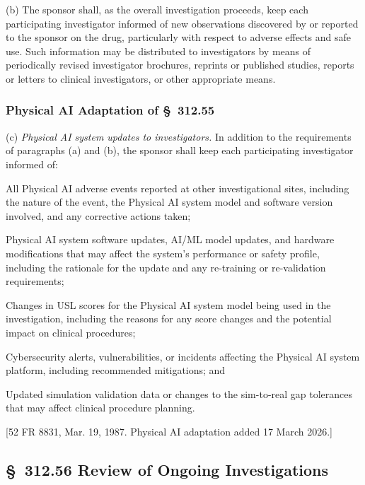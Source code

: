 (b) The sponsor shall, as the overall investigation proceeds, keep each participating investigator informed of new observations discovered by or reported to the sponsor on the drug, particularly with respect to adverse effects and safe use. Such information may be distributed to investigators by means of periodically revised investigator brochures, reprints or published studies, reports or letters to clinical investigators, or other appropriate means.

\subsubsection{Physical AI Adaptation of \S~312.55}

(c) \textit{Physical AI system updates to investigators.} In addition to the requirements of paragraphs (a) and (b), the sponsor shall keep each participating investigator informed of:

\begin{description}[leftmargin=0.8cm,style=sameline]
\item[(i)] All Physical AI adverse events reported at other investigational sites, including the nature of the event, the Physical AI system model and software version involved, and any corrective actions taken;
\item[(ii)] Physical AI system software updates, AI/ML model updates, and hardware modifications that may affect the system's performance or safety profile, including the rationale for the update and any re-training or re-validation requirements;
\item[(iii)] Changes in USL scores for the Physical AI system model being used in the investigation, including the reasons for any score changes and the potential impact on clinical procedures;
\item[(iv)] Cybersecurity alerts, vulnerabilities, or incidents affecting the Physical AI system platform, including recommended mitigations; and
\item[(v)] Updated simulation validation data or changes to the sim-to-real gap tolerances that may affect clinical procedure planning.
\end{description}

[52 FR 8831, Mar. 19, 1987. Physical AI adaptation added 17 March 2026.]

\subsection{\S~312.56 Review of Ongoing Investigations}

